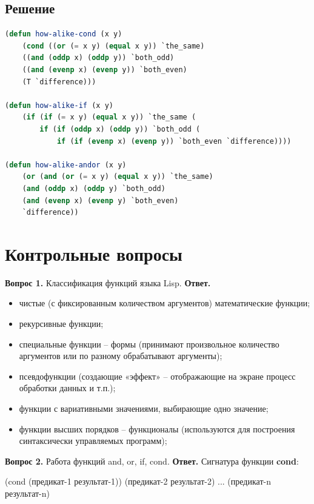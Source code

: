 \documentclass[12pt]{report}
\begin{document}
\subsection*{Решение}
\begin{lstlisting}[label=9,caption=Решение задания №9, language=lisp]
(defun how-alike-cond (x y)
	(cond ((or (= x y) (equal x y)) `the_same)
	((and (oddp x) (oddp y)) `both_odd)
	((and (evenp x) (evenp y)) `both_even)
	(T `difference)))

(defun how-alike-if (x y)
	(if (if (= x y) (equal x y)) `the_same (
		if (if (oddp x) (oddp y)) `both_odd (
			if (if (evenp x) (evenp y)) `both_even `difference))))

(defun how-alike-andor (x y)
	(or (and (or (= x y) (equal x y)) `the_same)
	(and (oddp x) (oddp y) `both_odd)
	(and (evenp x) (evenp y) `both_even)
	`difference))
\end{lstlisting}


	
\section*{Контрольные вопросы}
\textbf{Вопрос 1.} Классификация функций языка Lisp.\newline
\indent\textbf{Ответ.} 
	
\begin{itemize}
	\item чистые (с фиксированным количеством аргументов) математические функции;
	\item рекурсивные функции;
	\item специальные функции – формы (принимают произвольное количество аргументов или по разному обрабатывают аргументы);
	\item псевдофункции (создающие «эффект» – отображающие на экране процесс обработки данных и т.п.);
	\item функции с вариативными значениями, выбирающие одно значение;
	\item функции высших порядков – функционалы (используются для построения синтаксически управляемых программ);
\end{itemize}

\textbf{Вопрос 2.} Работа функций and, or, if, cond. \newline
\indent\textbf{Ответ. }
Сигнатура функции \textbf{cond}:

\indent(cond (предикат-1 результат-1)) \newline
\indent(предикат-2 результат-2) \newline
\indent...\newline
\indent(предикат-n результат-n)\newline
\end{document}
